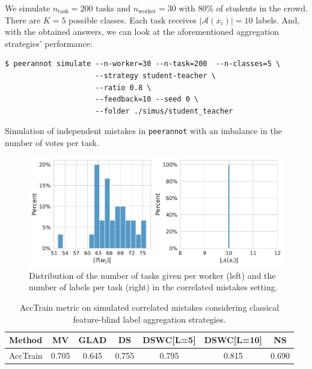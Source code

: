 We simulate $n_{\text{task}}=200$ tasks and $n_{\text{worker}}=30$ with $80\%$ of students in the crowd. There are $K=5$ possible classes. Each task receives $\vert\mathcal{A}(x_i)\vert=10$ labels. And, with the obtained answers, we can look at the aforementioned aggregation strategies' performance:


\begin{listing}[H]
    \begin{verbatim}
$ peerannot simulate --n-worker=30 --n-task=200  --n-classes=5 \
                     --strategy student-teacher \
                     --ratio 0.8 \
                     --feedback=10 --seed 0 \
                     --folder ./simus/student_teacher
    \end{verbatim}
    \caption{Simulation of independent mistakes in \texttt{peerannot} with an imbalance in the number of votes per task.}
    \label{lst:corr_mistakes}
\end{listing}

\begin{figure}[tbh]
    \centering
    \includegraphics[width=\textwidth]{./images_peerannot/fig-simu3-output-1.pdf}
    \caption{Distribution of the number of tasks given per worker (left) and the number of labels per task (right) in the correlated mistakes setting. }
    \label{fig:desc_correlated_mistakes}
\end{figure}

\begin{table}[htbp]
    \centering
    \caption{AccTrain metric on simulated correlated mistakes considering classical feature-blind label aggregation strategies.}
    \label{tab:accuracy_train_corr}
    \begin{tabular}{|l|c|c|c|c|c|c|}
    \hline
    \textbf{Method} & \textbf{MV} & \textbf{GLAD} & \textbf{DS} & \textbf{DSWC[L=5]} & \textbf{DSWC[L=10]} & \textbf{NS} \\
    \hline
    AccTrain & 0.705 &	0.645 &	0.755 	&0.795 &0.815 	&0.690\\
    \hline
    \end{tabular}
    \end{table}

